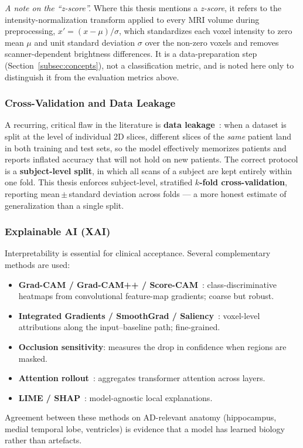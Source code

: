 \emph{A note on the ``z-score''.} Where this thesis mentions a \emph{z-score}, it refers to the intensity-normalization transform applied to every MRI volume during preprocessing, $x' = (x-\mu)/\sigma$, which standardizes each voxel intensity to zero mean $\mu$ and unit standard deviation $\sigma$ over the non-zero voxels and removes scanner-dependent brightness differences. It is a data-preparation step (Section~\ref{subsec:concepts}), not a classification metric, and is noted here only to distinguish it from the evaluation metrics above.

\subsubsection{Cross-Validation and Data Leakage}
A recurring, critical flaw in the literature is \textbf{data leakage}~\cite{wen2020convolutional,yagis2021effect,backstrom2018efficient}: when a dataset is split at the level of individual 2D slices, different slices of the \emph{same} patient land in both training and test sets, so the model effectively memorizes patients and reports inflated accuracy that will not hold on new patients. The correct protocol is a \textbf{subject-level split}, in which all scans of a subject are kept entirely within one fold. This thesis enforces subject-level, stratified \textbf{$k$-fold cross-validation}, reporting mean\,$\pm$\,standard deviation across folds --- a more honest estimate of generalization than a single split.

\subsubsection{Explainable AI (XAI)}
Interpretability is essential for clinical acceptance. Several complementary methods are used:
\begin{itemize}
    \item \textbf{Grad-CAM / Grad-CAM++ / Score-CAM}~\cite{selvaraju2017gradcam,chattopadhay2018gradcampp}: class-discriminative heatmaps from convolutional feature-map gradients; coarse but robust.
    \item \textbf{Integrated Gradients / SmoothGrad / Saliency}~\cite{sundararajan2017axiomatic,smilkov2017smoothgrad}: voxel-level attributions along the input--baseline path; fine-grained.
    \item \textbf{Occlusion sensitivity}: measures the drop in confidence when regions are masked.
    \item \textbf{Attention rollout}~\cite{abnar2020quantifying}: aggregates transformer attention across layers.
    \item \textbf{LIME / SHAP}~\cite{ribeiro2016why,lundberg2017unified}: model-agnostic local explanations.
\end{itemize}
Agreement between these methods on AD-relevant anatomy (hippocampus, medial temporal lobe, ventricles) is evidence that a model has learned biology rather than artefacts.

